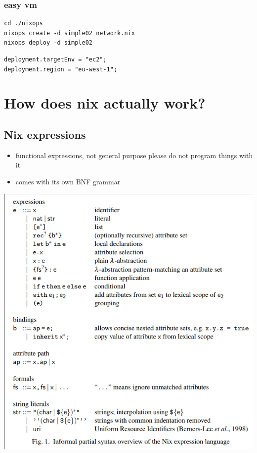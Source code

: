\documentclass[11pt]{article}
\begin{document}
\subsubsection{easy vm}
\label{sec:org4509c0f}
\begin{verbatim}
cd ./nixops
nixops create -d simple02 network.nix
nixops deploy -d simple02
\end{verbatim}
\begin{verbatim}
deployment.targetEnv = "ec2";
deployment.region = "eu-west-1";
\end{verbatim}
\section{How does nix actually work?}
\label{sec:org5a12f86}
\subsection{Nix expressions}
\label{sec:org870d315}
\begin{itemize}
\item functional expressions, not general purpose please do not program
things with it
\item comes with its own BNF grammar
\end{itemize}
\begin{center}
\includegraphics[width=.9\linewidth]{./images/screenshot-05.png}
\end{center}
\end{document}
